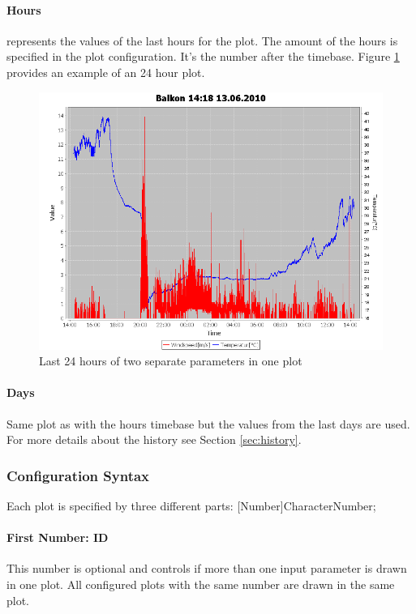 \paragraph{Hours} %
\label{par:hours}
represents the values of the last hours for the plot. The amount of the hours is specified in the plot configuration. It's the number after the timebase. Figure \ref{fig:hours} provides an example of an 24 hour plot.
\begin{figure}[ht]
    \centering
    \includegraphics[width=0.9\linewidth]{master/plot_exampleh.png}
    \caption{Last 24 hours of two separate parameters in one plot}
    \label{fig:hours}
\end{figure}

\paragraph{Days} %
\label{par:days}
Same plot as with the hours timebase but the values from the last days are used. For more details about the history see Section \ref{sec:history}.

\subsubsection{Configuration Syntax} %
\label{ssub:configuration_syntax}
Each plot is specified by three different parts: [Number]CharacterNumber;

\paragraph{First Number: ID} %
\label{par:first_number_id}
This number is optional and controls if more than one input parameter is drawn in one plot. All configured plots with the same number are drawn in the same plot.
